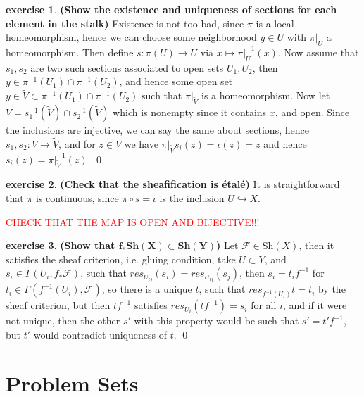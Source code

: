 \documentclass[10.5pt]{article}
\theoremstyle{definition}
\newtheorem{exe}{exercise}
\begin{document}
    \begin{exe}\label{Existence and uniqueness sections on stalks}
        \textbf{(Show the existence and uniqueness of sections for each element in the stalk)}
        Existence is not too bad, since \(\pi\) is a local homeomorphism, hence we can choose some neighborhood \(y \in U\) with \(\pi\vert_U\) a homeomorphism. Then define \(s: \pi(U) \to U\) via \(x \mapsto \pi\vert_U^{-1}(x)\). Now assume that \(s_1,s_2\) are two such sections associated to open sets \(U_1,U_2\), then \(y \in \pi^{-1}(U_1) \cap \pi^{-1}(U_2)\), and hence some open set \(y \in \tilde{V} \subset \pi^{-1}(U_1) \cap \pi^{-1}(U_2)\) such that \(\pi\vert_{\tilde{V}}\) is a homeomorphism. Now let \(V = s_1^{-1}(\tilde{V}) \cap s_2^{-1}(\tilde{V})\) which is nonempty since it contains \(x\), and open. Since the inclusions are injective, we can say the same about sections, hence \(s_1,s_2:  V \to \tilde{V}\), and for \(z \in V\) we have \(\pi\vert_{\tilde{V}}s_i(z) = \iota(z) = z\) and hence \(s_i(z) = \pi\vert_{\tilde{V}}^{-1}(z)\). \qed
    \end{exe}
    \begin{exe}\label{check sheafification cts}\textbf{(Check that the sheafification is \'etal\'e)} It is straightforward that \(\pi\) is continuous, since \(\pi \circ s = \iota\) is the inclusion \(U \hookrightarrow X\).  
        
    \textcolor{red}{CHECK THAT THE MAP IS OPEN AND BIJECTIVE!!!}
    \end{exe}
    \begin{exe}\label{pushforward sheaf exe}\textbf{(Show that \(\mathbf{f_* \textbf{Sh}(X) \subset \textbf{Sh}(Y)}\))}
        Let \(\mathcal{F} \in \text{Sh}(X)\), then it satisfies the sheaf criterion, i.e. gluing condition, take \(U \subset Y\), and \(s_i \in \Gamma(U_i,f_*\mathcal{F})\), such that \(res_{U_{ij}}(s_i) = res_{U_{ij}}(s_j)\), then \(s_i = t_if^{-1}\) for \(t_i \in \Gamma(f^{-1}(U_i),\mathcal{F})\), so there is a unique \(t\), such that \(res_{f^{-1}(U_i)}t = t_i\) by the sheaf criterion, but then \(tf^{-1}\) satisfies \(res_{U_i}(tf^{-1}) = s_i\) for all \(i\), and if it were not unique, then the other \(s'\) with this property would be such that \(s' = t'f^{-1}\), but \(t'\) would contradict uniqueness of \(t\). \qed
    \end{exe}
    


    \appendix

    \section{Problem Sets}
\end{document}
